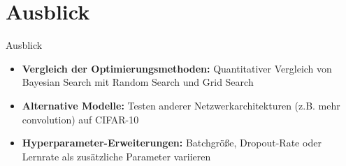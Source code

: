 \section{Ausblick}

\begin{frame}{Ausblick}
\begin{itemize}
    \item \textbf{Vergleich der Optimierungsmethoden:} 
          Quantitativer Vergleich von Bayesian Search mit Random Search und Grid Search
    \item \textbf{Alternative Modelle:} 
          Testen anderer Netzwerkarchitekturen (z.B. mehr convolution) auf CIFAR-10
    \item \textbf{Hyperparameter-Erweiterungen:} 
          Batchgröße, Dropout-Rate oder Lernrate als zusätzliche Parameter variieren
\end{itemize}
\end{frame}
